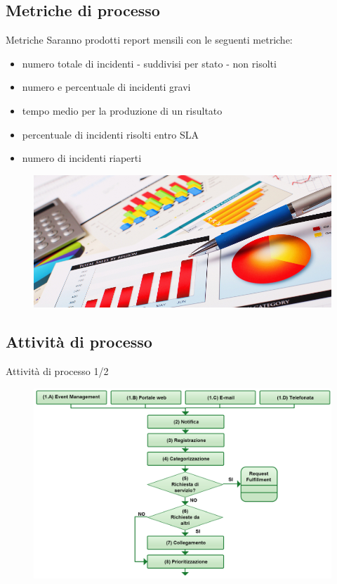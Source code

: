 \subsection*{Metriche di processo}
\begin{frame}{Metriche}
Saranno prodotti report mensili con le seguenti metriche:
\begin{itemize}
\item{numero totale di incidenti - suddivisi per stato - non risolti}
\item{numero e percentuale di incidenti gravi}
\item{tempo medio per la produzione di un risultato}
\item{percentuale di incidenti risolti entro SLA}
\item{numero di incidenti riaperti}
\end{itemize}
\begin{figure}
\includegraphics[scale=0.13]{Images/Metrics.png}
\end{figure}
\end{frame}

\subsection*{Attività di processo}
\begin{frame}{Attività di processo \small{1/2}}
\begin{figure}
\includegraphics[scale=0.22]{Images/Incident_management_1.png}
\end{figure}
\end{frame}

